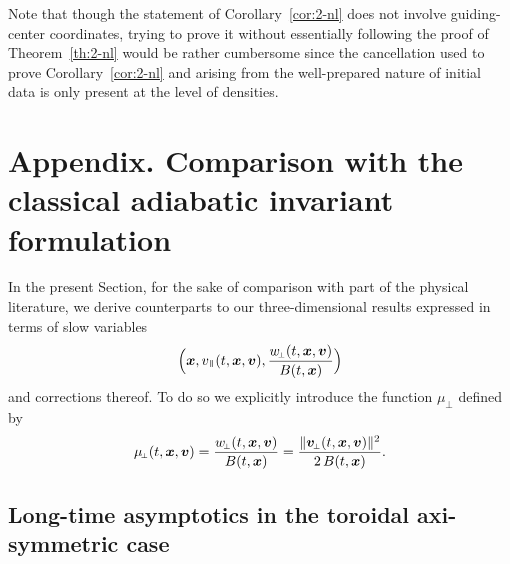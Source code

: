 \documentclass[10pt]{amsart}
\newcommand{\sperp}{{\scriptscriptstyle\perp}}
\theoremstyle{plain}
\theoremstyle{definition}
\newcommand\bfv{{\boldsymbol v}}
\newcommand\bfx{{\boldsymbol x}}
\newcommand\vpar{v_\mypar}
\newcommand\bvperp{\bfv_{\!\sperp}}
\newcommand\eperp{w_{\!\sperp}}
\newcommand\muperp{\mu_{\!\sperp}}
\newcommand{\mypar}{{\mkern3mu\vphantom{\perp}\vrule depth 0pt\mkern2mu\vrule depth 0pt\mkern3mu}}
\begin{document}
Note that though the statement of Corollary~\ref{cor:2-nl} does not involve guiding-center coordinates, trying to prove it without essentially following the proof of Theorem~\ref{th:2-nl} would be rather cumbersome since the cancellation used to prove Corollary~\ref{cor:2-nl} and arising from the well-prepared nature of initial data is only present at the level of densities.

\appendix
\section*{Appendix. Comparison with the classical adiabatic invariant formulation}\label{s:mu}
\renewcommand{\thesection}{\Alph{section}}

In the present Section, for the sake of comparison with part of the physical literature, we derive counterparts to our three-dimensional results expressed in terms of slow variables
\[
\Bigl(\bfx,\vpar(t,\bfx,\bfv),\frac{\eperp(t,\bfx,\bfv)}{B(t,\bfx)}\Bigr)
\]
and corrections thereof. To do so we explicitly introduce the function $\muperp$ defined by
\[
\muperp(t,\bfx,\bfv)
=\frac{\eperp(t,\bfx,\bfv)}{B(t,\bfx)}\\
=\frac{\|\bvperp(t,\bfx,\bfv)\|^2}{2\,B(t,\bfx)}.
\]

\subsection{Long-time asymptotics in the toroidal axi-symmetric case}
\end{document}
